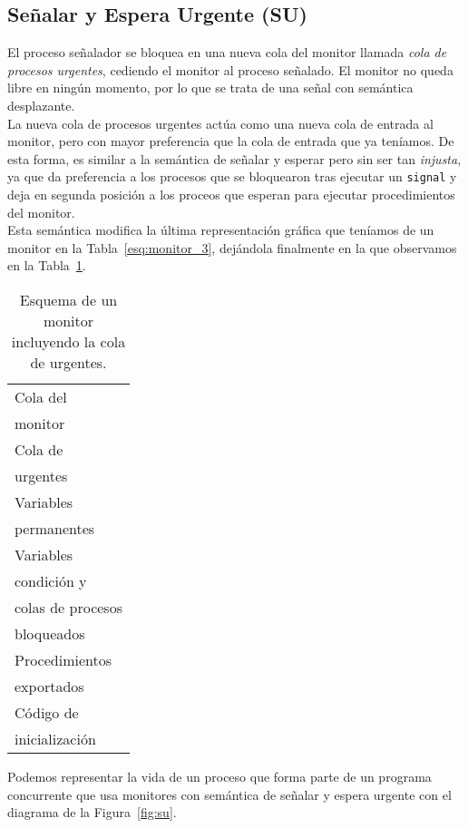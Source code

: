 \subsection{Señalar y Espera Urgente (SU)}
El proceso señalador se bloquea en una nueva cola del monitor llamada \textit{cola de procesos urgentes}, cediendo el monitor al proceso señalado. El monitor no queda libre en ningún momento, por lo que se trata de una señal con semántica desplazante.\\

La nueva cola de procesos urgentes actúa como una nueva cola de entrada al monitor, pero con mayor preferencia que la cola de entrada que ya teníamos. De esta forma, es similar a la semántica de señalar y esperar pero sin ser tan \textit{injusta}, ya que da preferencia a los procesos que se bloquearon tras ejecutar un \verb|signal| y deja en segunda posición a los proceos que esperan para ejecutar procedimientos del monitor.\\

Esta semántica modifica la última representación gráfica que teníamos de un monitor en la Tabla~\ref{esq:monitor_3}, dejándola finalmente en la que observamos en la Tabla~\ref{esq:monitor_4}.

\begin{table}[H]
\centering
\begin{tabular}{|l|}
\hline
Cola del\\
monitor \\
\hline
Cola de\\
urgentes \\
\hline
Variables \\
permanentes \\
\hline
Variables \\
condición y\\
colas de procesos\\
bloqueados\\
\hline
Procedimientos \\
exportados \\
\hline
Código de \\ 
inicialización \\
\hline
\end{tabular}
\caption{Esquema de un monitor incluyendo la cola de urgentes.}
\label{esq:monitor_4}
\end{table}

Podemos representar la vida de un proceso que forma parte de un programa concurrente que usa monitores con semántica de señalar y espera urgente con el diagrama de la Figura~\ref{fig:su}.\\

